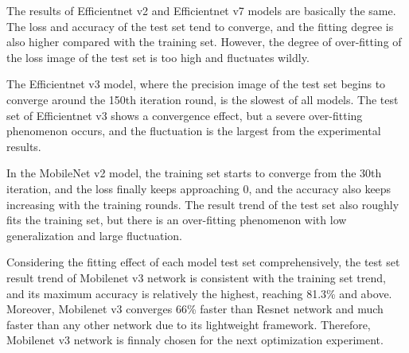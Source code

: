 \documentclass[a4paper,fleqn]{cas-sc}
\begin{document}
The results of Efficientnet v2 and Efficientnet v7 models are basically the same. The loss and accuracy of the test set tend to converge, and the fitting degree is also higher compared with the training set. However, the degree of over-fitting of the loss image of the test set is too high and fluctuates wildly. 

The Efficientnet v3 model, where the precision image of the test set begins to converge around the 150th iteration round, is the slowest of all models. The test set of Efficientnet v3 shows a convergence effect, but a severe over-fitting phenomenon occurs, and the fluctuation is the largest from the experimental results. 

In the MobileNet v2 model, the training set starts to converge from the 30th iteration, and the loss finally keeps approaching 0, and the accuracy also keeps increasing with the training rounds. The result trend of the test set also roughly fits the training set, but there is an over-fitting phenomenon with low generalization and large fluctuation.

Considering the fitting effect of each model test set comprehensively, the test set result trend of Mobilenet v3 network is consistent with the training set trend, and its maximum accuracy is relatively the highest, reaching 81.3\% and above. Moreover, Mobilenet v3 converges 66\% faster than Resnet network and much faster than any other network due to its lightweight framework. Therefore, Mobilenet v3 network is finnaly chosen for the next optimization experiment.
\end{document}
